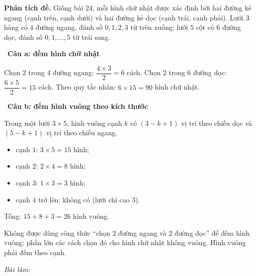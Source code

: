 \documentclass[11pt]{article}
\newif\ifsol \solfalse
\newcommand{\StuProb}[2]{\begin{probboxS}{#1}{#2}\StuProbBody\end{probboxS}}
\newcommand{\probsol}[1]{%
  \begin{lrbox}{\solmeasure}\begin{minipage}{\dimexpr\linewidth-24pt\relax}#1\end{minipage}\end{lrbox}%
  \ifsol
    \begin{solbox}#1\end{solbox}%
  \else
    \setlength{\solht}{\dimexpr\ht\solmeasure+\dp\solmeasure+0.85cm\relax}%
    \ifdim\solht<1.35cm\setlength{\solht}{1.35cm}\fi
    \ifdim\solht>\StudentMaxWork\setlength{\solht}{\StudentMaxWork}\fi
    \par\noindent\begin{minipage}{\linewidth}%
    \expandafter\StuProb\StuProbArgs
    \begin{tcolorbox}[colback=white,colframe=Line,boxrule=0.8pt,arc=5pt,
      left=8pt,right=8pt,top=4pt,bottom=4pt,height=\solht]{\footnotesize\color{Slate}\itshape\WorkWord}\end{tcolorbox}%
    \end{minipage}\par\medskip
  \fi}
\newlength{\StudentMaxWork}\setlength{\StudentMaxWork}{4.5cm}
\newcommand{\step}[2]{\par\smallskip\noindent{\bfseries\color{tmBlue!85!black}\StepWord~#1.}\ {\bfseries #2}\par\nopagebreak}
\def\WorkWord{Bài làm:}
\def\StepWord{Bước}
\begin{document}
\probsol{
\textbf{Phân tích đề.} Giống bài 24, mỗi hình chữ nhật được xác định bởi hai đường kẻ ngang (cạnh trên, cạnh dưới) và hai đường kẻ dọc
(cạnh trái, cạnh phải). Lưới $3$ hàng có $4$ đường ngang, đánh số $0,1,2,3$ từ trên xuống; lưới $5$ cột có $6$ đường dọc, đánh số
$0,1,\dots,5$ từ trái sang.

\step{1}{Câu a: đếm hình chữ nhật}
Chọn $2$ trong $4$ đường ngang: $\dfrac{4\times3}{2}=6$ cách. Chọn $2$ trong $6$ đường dọc: $\dfrac{6\times5}{2}=15$ cách.
Theo quy tắc nhân: $6\times15=90$ hình chữ nhật.

\step{2}{Câu b: đếm hình vuông theo kích thước}
\begin{recallbox}Trong một lưới $3\times5$, hình vuông cạnh $k$ có $(3-k+1)$ vị trí theo chiều dọc và $(5-k+1)$ vị trí theo chiều ngang.\end{recallbox}
\begin{itemize}[leftmargin=1.2em,itemsep=1pt,topsep=2pt]
\item cạnh $1$: $3\times5=15$ hình;
\item cạnh $2$: $2\times4=8$ hình;
\item cạnh $3$: $1\times3=3$ hình;
\item cạnh $4$ trở lên: không có (lưới chỉ cao $3$).
\end{itemize}
Tổng: $15+8+3=26$ hình vuông.
\begin{warnbox}Không được dùng công thức ``chọn $2$ đường ngang và $2$ đường dọc'' để đếm hình vuông: phần lớn các cách chọn đó cho hình chữ
nhật không vuông. Hình vuông phải đếm theo cạnh.\end{warnbox}

}
\end{document}
